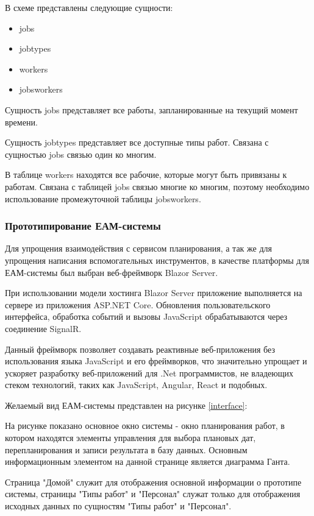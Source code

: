 В схеме представлены следующие сущности:
\begin{itemize}
	\item jobs
	\item jobtypes
	\item workers
	\item jobsworkers
\end{itemize}

Сущность jobs представляет все работы, запланированные на текущий момент времени.

Сущность jobtypes представляет все доступные типы работ. Связана с сущностью jobs связью один ко многим.

В таблице workers находятся все рабочие, которые могут быть привязаны к работам. Связана с таблицей jobs связью многие ко многим, поэтому необходимо использование промежуточной таблицы jobsworkers.

\subsubsection{Прототипирование ЕАМ-системы}

Для упрощения взаимодействия с сервисом планирования, а так же для упрощения написания вспомогательных инструментов, в качестве платформы для ЕАМ-системы был выбран веб-фреймворк Blazor Server.

При использовании модели хостинга Blazor Server приложение выполняется на сервере из приложения ASP.NET Core. Обновления пользовательского интерфейса, обработка событий и вызовы JavaScript обрабатываются через соединение SignalR.

Данный фреймворк позволяет создавать реактивные веб-приложения без использования языка JavaScript и его фреймворков, что значительно упрощает и ускоряет разработку веб-приложений для .Net программистов, не владеющих стеком технологий, таких как JavaScript, Angular, React и подобных.

Желаемый вид ЕАМ-системы представлен на рисунке \ref{interface}:


На рисунке показано основное окно системы - окно планирования работ, в котором находятся элементы управления для выбора плановых дат, перепланирования и записи результата в базу данных. Основным информационным элементом на данной странице является диаграмма Ганта.

Страница "Домой" служит для отображения основной информации о прототипе системы, страницы "Типы работ" и "Персонал" служат только для отображения исходных данных по сущностям "Типы работ" и "Персонал".

